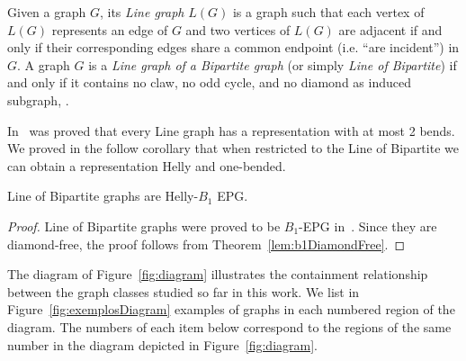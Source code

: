 Given a graph $G$, its \textit{Line graph} $L(G)$ is a graph such that each vertex of $L(G)$ represents an edge of $G$ and
  two vertices of $L(G)$ are adjacent if and only if their corresponding edges share a common endpoint (i.e. ``are incident'') in $G$.  
A graph $G$ is a \textit{Line graph of a Bipartite graph} (or simply \textit{Line of Bipartite}) if and only if it
contains no claw, no odd cycle, and no diamond as induced subgraph, \cite{harary1974line}.

In~\cite{daniel2014b} was proved that every Line graph has a representation with at most 2 bends. We proved in the follow corollary that when restricted to the Line of Bipartite we can obtain a representation Helly and one-bended.

\begin{corollary}\label{coro:lineOfBipartite}
 Line of Bipartite graphs are Helly-$B_1$ EPG. 
\end{corollary}

\begin{proof}
Line of Bipartite graphs were proved to be $B_1$-EPG in~\cite{golumbic2018edge}. Since they are diamond-free, the proof follows from Theorem~\ref{lem:b1DiamondFree}.

\end{proof}

The diagram of Figure~\ref{fig:diagram}
illustrates the containment relationship between the graph classes  studied so far in this work. 
We list in Figure~\ref{fig:exemplosDiagram} examples of graphs in each numbered region of the diagram. The numbers of each item below correspond to the regions of the same number in the diagram depicted in Figure~\ref{fig:diagram}.


